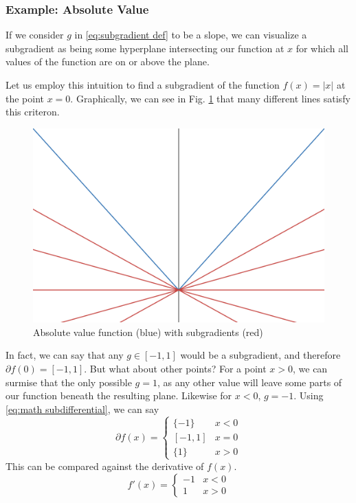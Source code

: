 \documentclass[journal,onecolumn]{IEEEtran}
\begin{document}
\subsubsection{Example: Absolute Value}
If we consider \(g\) in \eqref{eq:subgradient def} to be a slope, we can visualize a subgradient as being some hyperplane intersecting our function at \(x\) for which all values of the function are on or above the plane. 

Let us employ this intuition to find a subgradient of the function \(f(x) = |x|\) at the point \(x=0\). Graphically, we can see in Fig. \ref{fig:abs subgradients} that many different lines satisfy this criteron.
\begin{figure}[htbp]
    \centering
    \includegraphics[width=0.5\linewidth]{Figures/abs_subgradients.png}
    \caption{Absolute value function (blue) with subgradients (red)}
    \label{fig:abs subgradients}
\end{figure}
In fact, we can say that any \(g \in [-1,1]\) would be a subgradient, and therefore \(\partial f(0) = [-1,1]\). But what about other points? For a point \(x > 0\), we can surmise that the only possible \(g = 1\), as any other value will leave some parts of our function beneath the resulting plane. Likewise for \(x < 0\), \(g = -1\). Using \eqref{eq:math subdifferential}, we can say
\begin{equation}\label{eq:abs subdifferential}
\partial f(x) = \begin{cases}
    \{-1\} & x < 0 \\
    [-1, 1] & x = 0\\
    \{1\} & x > 0
\end{cases}
\end{equation}
This can be compared against the derivative of \(f(x)\).
\begin{equation}\label{eq:abs derivative}
f'(x) = \begin{cases}
            -1 & x < 0\\
            1 & x > 0
\end{cases}
\end{equation}
\end{document}
